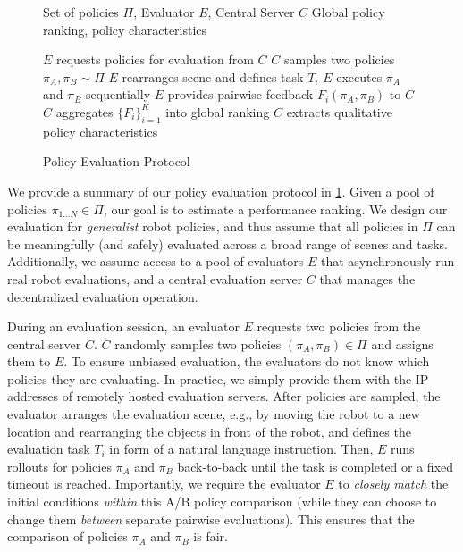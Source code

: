\begin{figure}
\begin{minipage}{0.6\textwidth}
\vspace{-0.8cm}
\begin{algorithm}[H]
\caption{Policy Evaluation Protocol}
\label{alg:eval_protocol}
\begin{algorithmic}[1]
\Require Set of policies $\Pi$, Evaluator $E$, Central Server $C$
\Ensure Global policy ranking, policy characteristics

    \State $E$ requests policies for evaluation from $C$
    \State $C$ samples two policies $\pi_A, \pi_B \sim \Pi$ %
    \State $E$ rearranges scene and defines task $T_i$
    \State $E$ executes $\pi_A$ and $\pi_B$ sequentially
    \State $E$ provides pairwise feedback $F_i(\pi_A, \pi_B)$ to $C$
\EndFor
\State $C$ aggregates $\{F_i\}_{i=1}^K$ into global ranking 
\State $C$ extracts qualitative policy characteristics 
\end{algorithmic}
\end{algorithm}
\end{minipage}
\vspace{-0.5cm}
\end{figure}
We provide a summary of our policy evaluation protocol in \cref{alg:eval_protocol}. Given a pool of policies $\pi_{1 \dots N} \in \Pi$, our goal is to estimate a performance ranking. %
We design our evaluation for \emph{generalist} robot policies, and thus assume that all policies in $\Pi$ can be meaningfully (and safely) evaluated across a broad range of scenes and tasks. Additionally, we assume access to a pool of evaluators $E$ that asynchronously run real robot evaluations, and a central evaluation server $C$ that manages the decentralized evaluation operation.

During an evaluation session, an evaluator $E$ requests two policies from the central server $C$. $C$ randomly samples two policies $(\pi_A, \pi_B) \in \Pi$ and assigns them to $E$. 
To ensure unbiased evaluation, the evaluators do not know which policies they are evaluating. In practice, we simply provide them with the IP addresses of remotely hosted evaluation servers. After policies are sampled, the evaluator arranges the evaluation scene, e.g., by moving the robot to a new location and rearranging the objects in front of the robot, and defines the evaluation task $T_i$ in form of a natural language instruction. Then, $E$ runs rollouts for policies $\pi_A$ and $\pi_B$ back-to-back until the task is completed or a fixed timeout is reached. Importantly, we require the evaluator $E$ to \emph{closely match} the initial conditions \emph{within} this A/B policy comparison (while they can choose to change them \emph{between} separate pairwise evaluations). This ensures that the comparison of policies $\pi_A$ and $\pi_B$ is fair.

